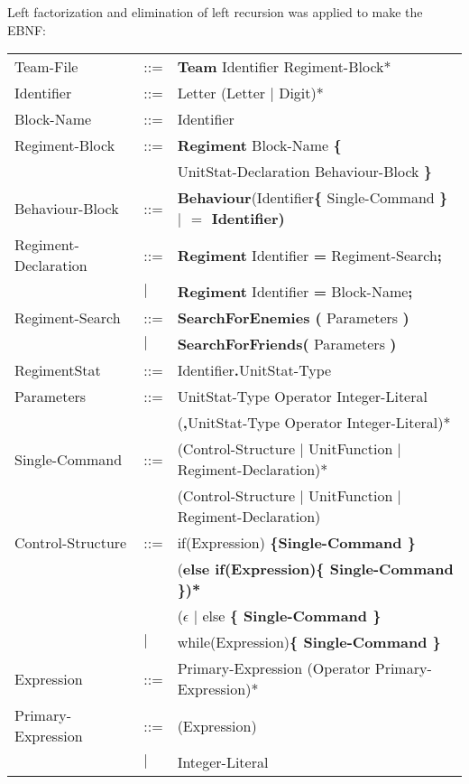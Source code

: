 	Left factorization and elimination of left recursion was applied to make the EBNF: \\
	\begin{center}
		\begin{longtable}{ l l p{7cm} }
			\endfirsthead
			\endhead
	Team-File					&	::=	&{\bf Team} Identifier Regiment-Block*\\
	Identifier					&	::=	&Letter (Letter $\mid$ Digit)*\\
	Block-Name					&	::=	&Identifier\\
	Regiment-Block				&	::=	&{\bf Regiment} Block-Name {\bf \{ } \\
								&		&UnitStat-Declaration Behaviour-Block \bf{\} }\\
	Behaviour-Block				&	::=	&{\bf Behaviour}(Identifier{\bf \{ }Single-Command \bf{\} } $\mid$ {\bf $=$} Identifier)\\
	Regiment-Declaration		&	::=	&{\bf Regiment} Identifier {\bf =} Regiment-Search{\bf ;}\\
								&$\mid$	&{\bf Regiment} Identifier {\bf =} Block-Name{\bf ;}\\
	Regiment-Search				&	::=	&{\bf SearchForEnemies (} Parameters {\bf )}\\
								&$\mid$	&{\bf SearchForFriends(} Parameters {\bf )}\\
	RegimentStat				&	::=	&Identifier{\bf.}UnitStat-Type \\
	Parameters					&	::=	&UnitStat-Type Operator Integer-Literal\\
								&		&({\bf ,}UnitStat-Type Operator Integer-Literal)*\\
	Single-Command				&	::=	&(Control-Structure $\mid$ UnitFunction $\mid$ Regiment-Declaration)*\\
								&		&(Control-Structure $\mid$ UnitFunction $\mid$ Regiment-Declaration)\\		
	Control-Structure			&	::=	&if(Expression) \bf{\{}Single-Command \bf{\}}\\
								&		&(\bf{else if(}Expression\bf{)\{ }Single-Command\bf{ \}})* \\
								&		&($\epsilon$ $\mid$ else \bf{\{ }Single-Command \bf{\} }\\					   
								&$\mid$	&while(Expression)\bf{\{ } Single-Command \bf{\}}\\
	Expression					&	::=	&Primary-Expression (Operator Primary-Expression)*\\
	Primary-Expression			&	::=	&(Expression)\\
								&$\mid$	&Integer-Literal \\

\end{longtable}
\end{center}
